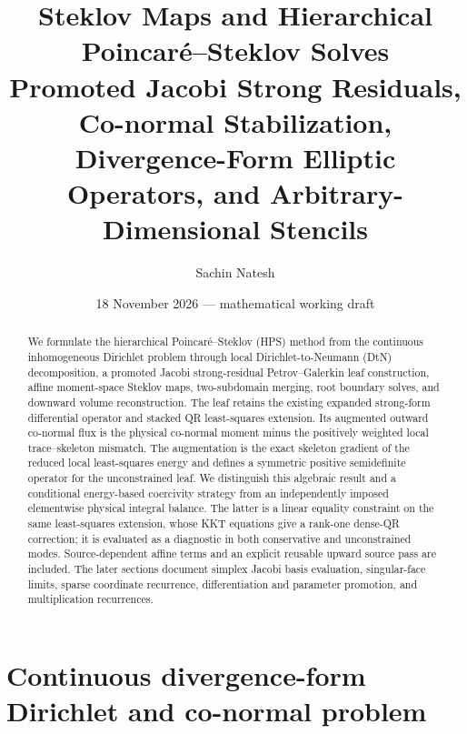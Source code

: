 \documentclass[11pt]{article}
\title{Steklov Maps and Hierarchical Poincar\'e--Steklov Solves\\
\large Promoted Jacobi Strong Residuals, Co-normal Stabilization,\\
Divergence-Form Elliptic Operators, and Arbitrary-Dimensional Stencils}
\author{Sachin Natesh}
\date{18 November 2026 --- mathematical working draft}
\begin{document}
\maketitle

\begin{abstract}
We formulate the hierarchical Poincar\'e--Steklov (HPS) method from the
continuous inhomogeneous Dirichlet problem through local Dirichlet-to-Neumann
(DtN) decomposition, a promoted Jacobi strong-residual Petrov--Galerkin
leaf construction, affine moment-space Steklov maps, two-subdomain merging,
root boundary solves, and downward volume reconstruction.  The leaf retains
the existing expanded strong-form differential operator and stacked QR
least-squares extension.  Its augmented outward co-normal flux is the
physical co-normal moment minus the positively weighted local
trace--skeleton mismatch.  The augmentation is the exact skeleton
gradient of the reduced local least-squares energy and defines a symmetric
positive semidefinite operator for the unconstrained leaf.  We distinguish
this algebraic result and a conditional energy-based coercivity strategy
from an independently imposed elementwise physical integral balance.
The latter is a linear equality constraint on the same least-squares extension,
whose KKT equations give a rank-one dense-QR correction; it is evaluated as a diagnostic
in both conservative and unconstrained modes.  Source-dependent affine
terms and an explicit reusable upward source pass are included.  The
later sections document simplex Jacobi basis evaluation, singular-face
limits, sparse coordinate recurrence, differentiation and parameter promotion,
and multiplication recurrences.
\end{abstract}

\section{Continuous divergence-form Dirichlet and co-normal problem}
\end{document}
